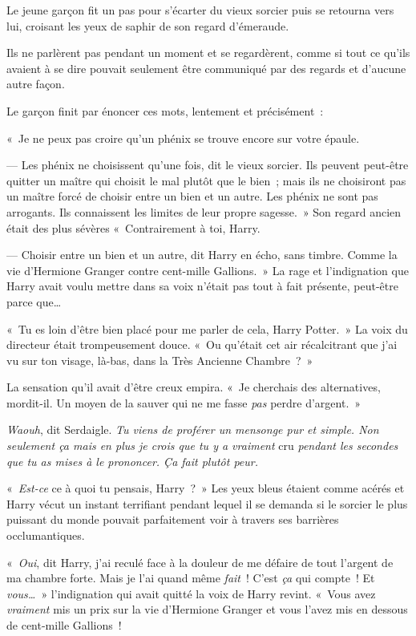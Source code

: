 Le jeune garçon fit un pas pour s'écarter du vieux sorcier puis se retourna vers lui, croisant les yeux de saphir de son regard d'émeraude.

Ils ne parlèrent pas pendant un moment et se regardèrent, comme si tout ce qu'ils avaient à se dire pouvait seulement être communiqué par des regards et d'aucune autre façon.

Le garçon finit par énoncer ces mots, lentement et précisément~:

«~Je ne peux pas croire qu'un phénix se trouve encore sur votre épaule.

--- Les phénix ne choisissent qu'une fois, dit le vieux sorcier. Ils peuvent peut-être quitter un maître qui choisit le mal plutôt que le bien~; mais ils ne choisiront pas un maître forcé de choisir entre un bien et un autre. Les phénix ne sont pas arrogants. Ils connaissent les limites de leur propre sagesse.~» Son regard ancien était des plus sévères «~Contrairement à toi, Harry.

--- Choisir entre un bien et un autre, dit Harry en écho, sans timbre. Comme la vie d'Hermione Granger contre cent-mille Gallions.~» La rage et l'indignation que Harry avait voulu mettre dans sa voix n'était pas tout à fait présente, peut-être parce que…

«~Tu es loin d'être bien placé pour me parler de cela, Harry Potter.~» La voix du directeur était trompeusement douce. «~Ou qu'était cet air récalcitrant que j'ai vu sur ton visage, là-bas, dans la Très Ancienne Chambre~?~»

La sensation qu'il avait d'être creux empira. «~Je cherchais des alternatives, mordit-il. Un moyen de la sauver qui ne me fasse \emph{pas} perdre d'argent.~»

\emph{Waouh}, dit Serdaigle. \emph{Tu viens de proférer un mensonge pur et simple. Non seulement ça mais en plus je crois que tu y a vraiment} cru \emph{pendant les secondes que tu as mises à le prononcer. Ça fait plutôt peur.}

«~\emph{Est-ce} ce à quoi tu pensais, Harry~?~» Les yeux bleus étaient comme acérés et Harry vécut un instant terrifiant pendant lequel il se demanda si le sorcier le plus puissant du monde pouvait parfaitement voir à travers ses barrières occlumantiques.

«~\emph{Oui}, dit Harry, j'ai reculé face à la douleur de me défaire de tout l'argent de ma chambre forte. Mais je l'ai quand même \emph{fait}~! C'est \emph{ça} qui compte~! Et \emph{vous…}~» l'indignation qui avait quitté la voix de Harry revint. «~Vous avez \emph{vraiment} mis un prix sur la vie d'Hermione Granger et vous l'avez mis en dessous de cent-mille Gallions~!

